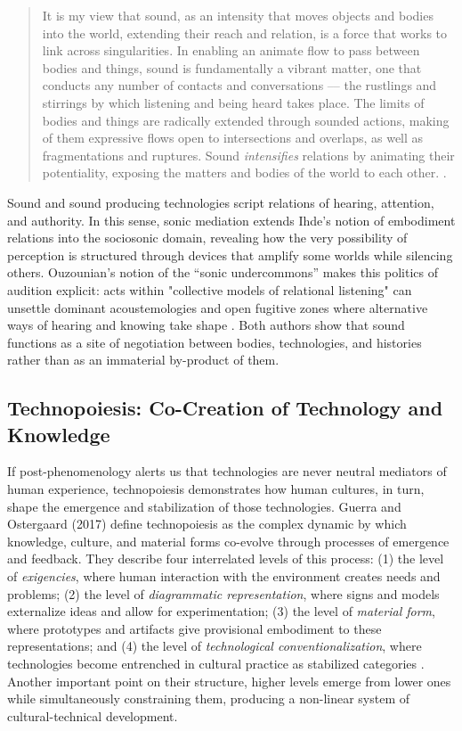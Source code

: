 \begin{quotation}
It is my view that sound, as an intensity that moves objects and bodies into the world, extending their reach and relation, is a force that works to link across singularities. In enabling an animate flow to pass between bodies and things, sound is fundamentally a vibrant matter, one that conducts any number of contacts and conversations –-- the rustlings and stirrings by which listening and being heard takes place. The limits of bodies and things are radically extended through sounded actions, making of them expressive flows open to intersections and overlaps, as well as fragmentations and ruptures. Sound \emph{intensifies} relations by animating their potentiality, exposing the matters and bodies of the world to each other. \parencite[p.61]{LaBelle_2018}.  
\end{quotation}

Sound and sound producing technologies script relations of hearing, attention, and authority.  In this sense, sonic mediation extends Ihde’s notion of embodiment relations into the sociosonic domain, revealing how the very possibility of perception is structured through devices that amplify some worlds while silencing others. Ouzounian’s notion of the “sonic undercommons” makes this politics of audition explicit: acts within "collective models of relational listening" can unsettle dominant acoustemologies and open fugitive zones where alternative ways of hearing and knowing take shape \parencite[pp.17-18]{Ouzounian_2021}. Both authors show that sound functions as a site of negotiation between bodies, technologies, and histories rather than as an immaterial by-product of them.

\newpage \subsection{Technopoiesis: Co-Creation of Technology and Knowledge}

If post-phenomenology alerts us that technologies are never neutral mediators of human experience, technopoiesis demonstrates how human cultures, in turn, shape the emergence and stabilization of those technologies. Guerra and Ostergaard (2017) define technopoiesis as the complex dynamic by which knowledge, culture, and material forms co-evolve through processes of emergence and feedback. They describe four interrelated levels of this process: (1) the level of \emph{exigencies}, where human interaction with the environment creates needs and problems; (2) the level of \emph{diagrammatic representation}, where signs and models externalize ideas and allow for experimentation; (3) the level of \emph{material form}, where prototypes and artifacts give provisional embodiment to these representations; and (4) the level of \emph{technological conventionalization}, where technologies become entrenched in cultural practice as stabilized categories \parencites[237-238]{Guerra_Ostergaard_2017}. Another important point on their structure, higher levels emerge from lower ones while simultaneously constraining them, producing a non-linear system of cultural-technical development.

